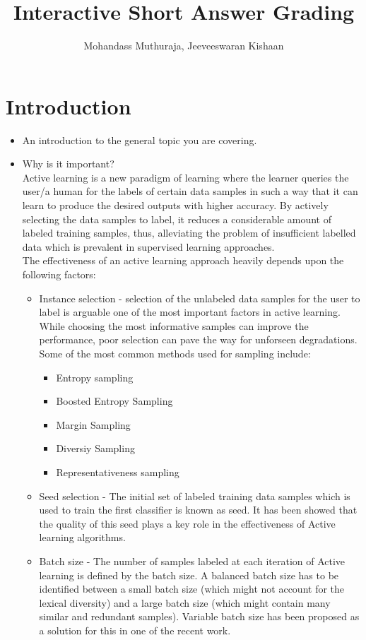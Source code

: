 \documentclass[rnd]{mas_proposal}
\title{Interactive Short Answer Grading}
\author{Mohandass Muthuraja, Jeeveeswaran Kishaan}
\begin{document}
\maketitle

\pagestyle{plain}

\chapter{Introduction}
\begin{itemize}
    \item An introduction to the general topic you are covering.
    \item Why is it important? \\
     Active learning is a new paradigm of learning where the learner queries the user/a human for the labels of certain data samples in such a way that it can learn to produce the desired outputs with higher accuracy. By actively selecting the data samples to label, it reduces a considerable amount of labeled training samples, thus, alleviating the problem of insufficient labelled data which is prevalent in supervised learning approaches. \\
     The effectiveness of an active learning approach heavily depends upon the following factors:
     \begin{itemize}
     \item Instance selection - selection of the unlabeled data samples for the user to label is arguable one of the most important factors in active learning. While choosing the most informative samples can improve the performance, poor selection can pave the way for unforseen degradations. Some of the most common methods used for sampling include:
     \begin{itemize}
     \item Entropy sampling
     \item Boosted Entropy Sampling
     \item Margin Sampling
     \item Diversiy Sampling
     \item Representativeness sampling
     \end{itemize}
     \item Seed selection - The initial set of labeled training data samples which is used to train the first classifier is known as seed. It has been showed that the quality of this seed plays a key role in the effectiveness of Active learning algorithms.

	\item Batch size - The number of samples labeled at each iteration of Active learning is defined by the batch size. A balanced batch size has to be identified between a small batch size (which might not account for the lexical diversity) and a large batch size (which might contain many similar and redundant samples). Variable batch size has been proposed as a solution for this in one of the recent work.
	

\end{itemize}
\end{itemize}
\end{document}
